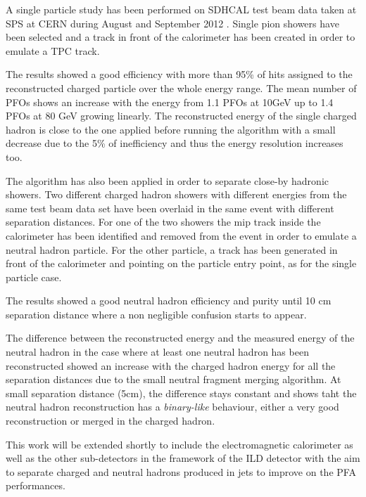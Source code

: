 \documentclass[cits]{JINST}
\begin{document}
A single particle study has been performed on SDHCAL test beam data taken at SPS at CERN during August and September 2012 \cite{sdhcal-paper}. Single pion showers have been selected and a track in front of the calorimeter has been created in order to emulate a TPC track.

The results showed a good efficiency with more than 95\% of hits assigned to the reconstructed charged particle over the whole energy range. The mean number of PFOs shows an increase with the energy from 1.1 PFOs at 10GeV up to 1.4 PFOs at 80 GeV growing linearly. The reconstructed energy of the single charged hadron is close to the one applied before running the algorithm with a small decrease due to the 5\% of inefficiency and thus the energy resolution increases too.

The algorithm has also been applied in order to separate close-by hadronic showers. Two different charged hadron showers with different energies from the same test beam data set have been overlaid in the same event with different separation distances. For one of the two showers the mip track inside the calorimeter has been identified and removed from the event in order to emulate a neutral hadron particle. For the other particle, a track has been generated in front of the calorimeter and pointing on the particle entry point, as for the single particle case. 

The results showed a good neutral hadron efficiency and purity until 10 cm separation distance where a non negligible confusion starts to appear. 

The difference between the reconstructed energy and the measured energy of the neutral hadron in the case where at least one neutral hadron has been reconstructed showed an increase with the charged hadron energy for all the separation distances due to the small neutral fragment merging algorithm. At small separation distance (5cm), the difference stays constant and shows taht the neutral hadron reconstruction has a \textit{binary-like} behaviour, either a very good reconstruction or merged in the charged hadron.

This work will be extended shortly to include the electromagnetic calorimeter as well as the other sub-detectors in the framework of the ILD detector with the aim to separate charged and neutral hadrons produced in jets to improve on the PFA performances.
\end{document}
